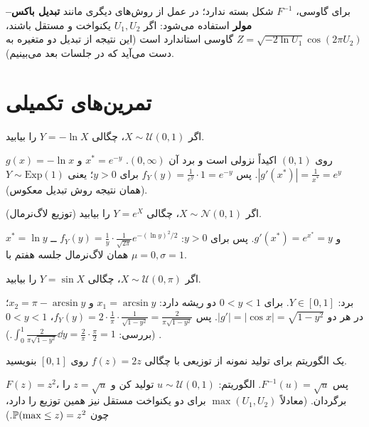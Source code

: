 \begin{note}
\notetitle برای گاوسی، $F^{-1}$ شکل بسته ندارد؛ در عمل از روش‌های دیگری مانند \textbf{تبدیل باکس--مولر} استفاده می‌شود: اگر $U_1,U_2$ یکنواخت و مستقل باشند، $Z=\sqrt{-2\ln U_1}\cos(2\pi U_2)$ گاوسی استاندارد است (این نتیجه از تبدیل دو متغیره به دست می‌آید که در جلسات بعد می‌بینیم).
\end{note}

\section{تمرین‌های تکمیلی}

\begin{exercise}
اگر $X\sim\mathcal U(0,1)$، چگالی $Y=-\ln X$ را بیابید.
\end{exercise}
\begin{solution}
$g(x)=-\ln x$ روی $(0,1)$ اکیداً نزولی است و برد آن $(0,\infty)$. $x^*=e^{-y}$ و $|g'(x^*)|=\frac{1}{x^*}=e^{y}$. پس $f_Y(y)=\frac{1}{e^y}\cdot1=e^{-y}$ برای $y>0$؛ یعنی $Y\sim\mathrm{Exp}(1)$ (همان نتیجه روش تبدیل معکوس).
\end{solution}

\begin{exercise}
اگر $X\sim\mathcal N(0,1)$، چگالی $Y=e^X$ را بیابید (توزیع لاگ‌نرمال).
\end{exercise}
\begin{solution}
$x^*=\ln y$ و $g'(x^*)=e^{x^*}=y$. پس برای $y>0$:
$f_Y(y)=\frac{1}{y}\cdot\frac{1}{\sqrt{2\pi}}e^{-(\ln y)^2/2}$ ــ همان لاگ‌نرمال جلسه هفتم با $\mu=0,\sigma=1$.
\end{solution}

\begin{exercise}
اگر $X\sim\mathcal U(0,\pi)$، چگالی $Y=\sin X$ را بیابید.
\end{exercise}
\begin{solution}
برد: $Y\in[0,1]$. برای $0<y<1$ دو ریشه دارد: $x_1=\arcsin y$ و $x_2=\pi-\arcsin y$؛ در هر دو $|g'|=|\cos x|=\sqrt{1-y^2}$. پس
$f_Y(y)=2\cdot\frac{1}{\pi}\cdot\frac{1}{\sqrt{1-y^2}}=\frac{2}{\pi\sqrt{1-y^2}}$، $0<y<1$. (بررسی: $\int_0^1\frac{2}{\pi\sqrt{1-y^2}}\dd y=\frac2\pi\cdot\frac\pi2=1$.)
\end{solution}

\begin{exercise}
یک الگوریتم برای تولید نمونه از توزیعی با چگالی $f(z)=2z$ روی $[0,1]$ بنویسید.
\end{exercise}
\begin{solution}
$F(z)=z^2$، پس $F^{-1}(u)=\sqrt u$. الگوریتم: $u\sim\mathcal U(0,1)$ تولید کن و $z=\sqrt u$ را برگردان. (معادلاً $\max(U_1,U_2)$ برای دو یکنواخت مستقل نیز همین توزیع را دارد، چون $\mathbb{P}(\max\le z)=z^2$.)
\end{solution}
